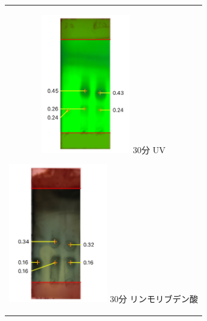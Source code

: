 \documentclass[a4paper,papersize,dvipdfmx]{jsarticle}
\begin{document}
\begin{figure}[H]
\begin{center}
\begin{tabular}{c}

\begin{minipage}{0.20\hsize}
\begin{center}
\includegraphics[clip, height=6cm]{imgs4/tlc1.jpg}
\hspace{1.6cm} \footnotesize{30分 UV}
\end{center}
\end{minipage}

\begin{minipage}{0.05\hsize}
        \hspace{2mm}
      \end{minipage}

\begin{minipage}{0.20\hsize}
\begin{center}
\includegraphics[clip, height=6cm]{imgs4/tlc2.jpg}
\hspace{1.6cm} \footnotesize{30分 リンモリブデン酸}
\end{center}
\end{minipage}

\begin{minipage}{0.05\hsize}
        \hspace{2mm}
      \end{minipage}


\end{tabular}
\end{center}
\end{figure}
\end{document}
